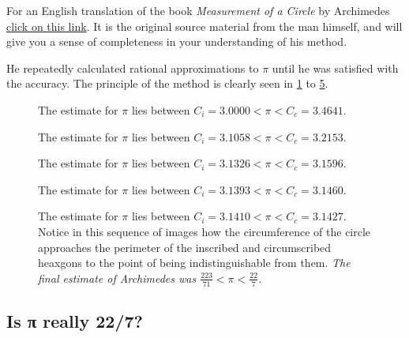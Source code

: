 \documentclass[
  a4paper,
]{article}
\begin{document}
For an English translation of the book \emph{Measurement of a Circle} by
Archimedes \href{auxiliary/Archimedes-Circle.pdf}{click on this link}.
It is the original source material from the man himself, and will give
you a sense of completeness in your understanding of his method.

He repeatedly calculated rational approximations to \(\pi\) until he was
satisfied with the accuracy. The principle of the method is clearly seen
in \cref{fig:six-gon} to \cref{fig:ninety-six-gon}.

\begin{figure}
\centering

\caption{The estimate for \(\pi\) lies between
\(C_i = 3.0000 < \pi < C_c = 3.4641\).}\label{fig:six-gon}
\end{figure}

\begin{figure}
\centering

\caption{The estimate for \(\pi\) lies between
\(C_i = 3.1058 < \pi < C_c = 3.2153\).}\label{fig:twelve-gon}
\end{figure}

\begin{figure}
\centering

\caption{The estimate for \(\pi\) lies between
\(C_i = 3.1326 < \pi < C_c = 3.1596\).}\label{fig:twenty-four-gon}
\end{figure}

\begin{figure}
\centering

\caption{The estimate for \(\pi\) lies between
\(C_i = 3.1393 < \pi < C_c = 3.1460\).}\label{fig:forty-eight-gon}
\end{figure}

\begin{figure}
\centering

\caption{The estimate for \(\pi\) lies between
\(C_i = 3.1410 < \pi < C_c = 3.1427\). Notice in this sequence of images
how the circumference of the circle approaches the perimeter of the
inscribed and circumscribed heaxgons to the point of being
indistinguishable from them. \emph{The final estimate of Archimedes was
\(\frac{223}{71} < \pi < \frac{22}{7}\).}}\label{fig:ninety-six-gon}
\end{figure}

\subsection{Is π really 22/7?}\label{is-ux3c0-really-227}
\end{document}
